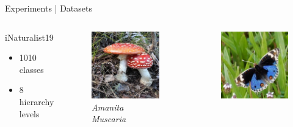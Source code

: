 \begin{frame}{Experiments | Datasets}
  \begin{columns}
    \begin{column}{0.35\textwidth}
      \alert{{\large iNaturalist19}}
      \begin{itemize}
        \item 1010 classes
        \item 8 hierarchy levels
      \end{itemize}
    \end{column}
    \begin{column}{0.2\textwidth}
      \begin{figure}
        \centering
        \includegraphics[width=.7\linewidth]{figures/iNaturalist19/example_1.jpg}
        \captionsetup{labelformat=empty, justification=centering, font=scriptsize}
        \caption{\emph{Amanita Muscaria}}
      \end{figure}
    \end{column}
    \begin{column}{0.2\textwidth}
      \begin{figure}
        \centering
        \includegraphics[width=.7\linewidth]{figures/iNaturalist19/example_2.jpg}

\end{figure}
\end{column}
\end{columns}
\end{frame}
